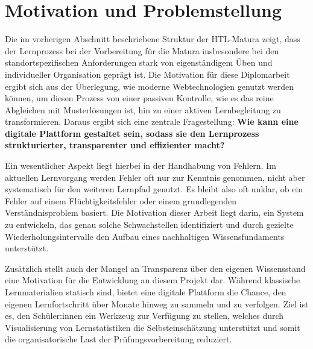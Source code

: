 \section{Motivation und Problemstellung}
\setauthor{\firstauthor}

Die im vorherigen Abschnitt beschriebene Struktur der HTL-Matura zeigt, dass der Lernprozess bei der Vorbereitung für die Matura insbesondere bei den standortspezifischen Anforderungen stark von eigenständigem Üben und individueller Organisation geprägt ist. Die Motivation für diese Diplomarbeit ergibt sich aus der Überlegung, wie moderne Webtechnologien genutzt werden können, um diesen Prozess von einer passiven Kontrolle, wie es das reine Abgleichen mit Musterlösungen ist, hin zu einer aktiven Lernbegleitung zu transformieren. Daraus ergibt sich eine zentrale Fragestellung: 
\textbf{Wie kann eine digitale Plattform gestaltet sein, sodass sie den Lernprozess strukturierter, transparenter und effizienter macht?}

Ein wesentlicher Aspekt liegt hierbei in der Handhabung von Fehlern. Im aktuellen Lernvorgang werden Fehler oft nur zur Kenntnis genommen, nicht aber systematisch für den weiteren Lernpfad genutzt. Es bleibt also oft unklar, ob ein Fehler auf einem Flüchtigkeitsfehler oder einem grundlegenden Verständnisproblem basiert. Die Motivation dieser Arbeit liegt darin, ein System zu entwickeln, das genau solche Schwachstellen identifiziert und durch gezielte Wiederholungsintervalle den Aufbau eines nachhaltigen Wissensfundaments unterstützt.

Zusätzlich stellt auch der Mangel an Transparenz über den eigenen Wissensstand eine Motivation für die Entwicklung an diesem Projekt dar. Während klassische Lernmaterialien statisch sind, bietet eine digitale Plattform die Chance, den eigenen Lernfortschritt über Monate hinweg zu sammeln und zu verfolgen. Ziel ist es, den Schüler:innen ein Werkzeug zur Verfügung zu stellen, welches durch Visualisierung von Lernstatistiken die Selbsteinschätzung unterstützt und somit die organisatorische Last der Prüfungsvorbereitung reduziert.

